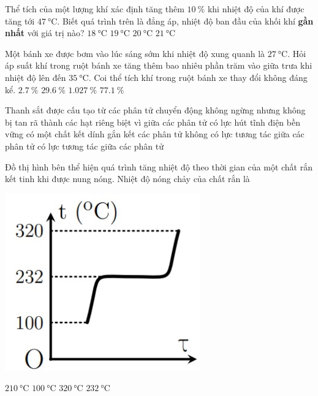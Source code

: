 \begin{ex}
	Thể tích của một lượng khí xác định tăng thêm $\SI{10}{\percent}$ khi nhiệt độ của khí được tăng tới $\SI{47}{\celsius}$. Biết quá trình trên là đẳng áp, nhiệt độ ban đầu của khối khí \textbf{gần nhất} với giá trị nào?
	\choice
	{\True $\SI{18}{\celsius}$}
	{$\SI{19}{\celsius}$}
	{$\SI{20}{\celsius}$}
	{$\SI{21}{\celsius}$}
\end{ex}
\begin{ex}
	Một bánh xe được bơm vào lúc sáng sớm khi nhiệt độ xung quanh là $\SI{27}{\celsius}$. Hỏi áp suất khí trong ruột bánh xe tăng thêm bao nhiêu phần trăm vào giữa trưa khi nhiệt độ lên đến $\SI{35}{\celsius}$. Coi thể tích khí trong ruột bánh xe thay đổi không đáng kể.
	\choice
	{\True $\SI{2.7}{\percent}$}
	{$\SI{29.6}{\percent}$}
	{$\SI{1.027}{\percent}$}
	{$\SI{77.1}{\percent}$}
\end{ex}
\begin{ex}
Thanh sắt được cấu tạo từ các phân tử chuyển động không ngừng nhưng không bị tan rã thành các hạt riêng biệt vì
	\choice
	{giữa các phân tử có lực hút tĩnh điện bền vững}
	{có một chất kết dính gắn kết các phân tử}
	{không có lực tương tác giữa các phân tử}
	{\True có lực tương tác giữa các phân tử}
	\loigiai{}
\end{ex}
\begin{ex}
	Đồ thị hình bên thể hiện quá trình tăng nhiệt độ theo thời gian của một chất rắn kết tinh khi được nung nóng. Nhiệt độ nóng chảy của chất rắn là
	\begin{center}
		\includegraphics[width=0.2\linewidth]{../figs/D12-5-1}	
	\end{center}
	\choice
	{$\SI{210}{\celsius}$}
	{$\SI{100}{\celsius}$}
	{$\SI{320}{\celsius}$}
	{\True $\SI{232}{\celsius}$}
	\loigiai{}
\end{ex}
